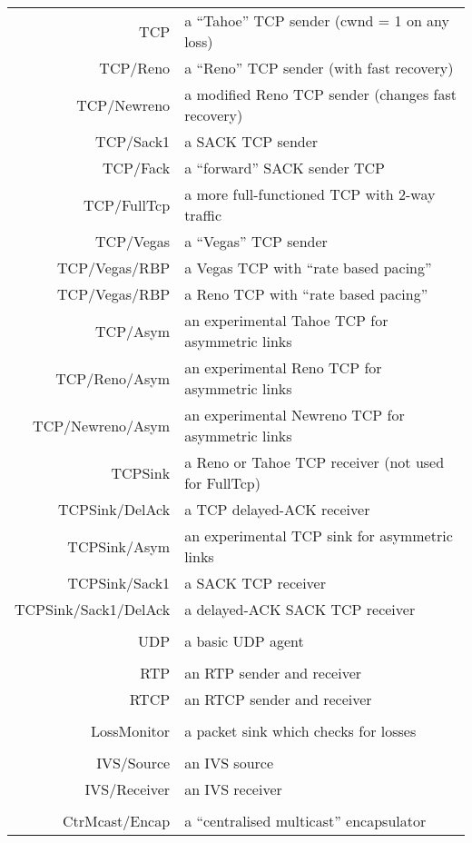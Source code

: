 \begin{longtable}{rl}
  TCP & a ``Tahoe'' TCP sender (cwnd = 1 on any loss)   \\
  TCP/Reno & a ``Reno'' TCP sender  (with fast recovery)        \\
  TCP/Newreno & a modified Reno TCP sender (changes fast recovery)      \\
  TCP/Sack1 & a SACK TCP sender \\
  TCP/Fack & a ``forward'' SACK sender TCP      \\
  TCP/FullTcp & a more full-functioned TCP with 2-way traffic   \\
  TCP/Vegas & a ``Vegas'' TCP sender    \\
  TCP/Vegas/RBP & a Vegas TCP with ``rate based pacing''        \\
  TCP/Vegas/RBP & a Reno TCP with ``rate based pacing'' \\
  TCP/Asym & an experimental Tahoe TCP for asymmetric links     \\
  TCP/Reno/Asym & an experimental Reno TCP for asymmetric links \\
  TCP/Newreno/Asym & an experimental Newreno TCP for asymmetric links   \\
  TCPSink & a Reno or Tahoe TCP receiver (not used for FullTcp) \\
  TCPSink/DelAck & a TCP delayed-ACK receiver   \\
  TCPSink/Asym & an experimental  TCP sink for asymmetric links \\
  TCPSink/Sack1 & a SACK TCP receiver   \\
  TCPSink/Sack1/DelAck & a delayed-ACK SACK TCP receiver        \\
        \\
  UDP & a basic UDP agent\\
	\\
  RTP & an RTP sender and receiver  \\
  RTCP & an RTCP sender and receiver    \\
        \\
  LossMonitor & a packet sink which checks for losses   \\
        \\
  IVS/Source & an IVS source    \\
  IVS/Receiver & an IVS receiver        \\
        \\
  CtrMcast/Encap & a ``centralised multicast'' encapsulator     \\

\end{longtable}
